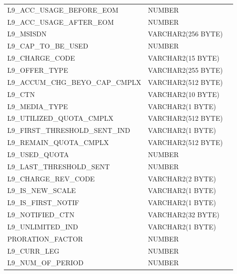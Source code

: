 \documentclass[12pt,twoside]{article}
\begin{document}
\begin{longtable}{lll}
 L9\_ACC\_USAGE\_BEFORE\_EOM          &  NUMBER               &               \\
 L9\_ACC\_USAGE\_AFTER\_EOM           &  NUMBER               &               \\
 L9\_MSISDN                           &  VARCHAR2(256 BYTE)   &               \\
 L9\_CAP\_TO\_BE\_USED                &  NUMBER               &               \\
 L9\_CHARGE\_CODE                     &  VARCHAR2(15 BYTE)    &               \\
 L9\_OFFER\_TYPE                      &  VARCHAR2(255 BYTE)   &               \\
 L9\_ACCUM\_CHG\_BEYO\_CAP\_CMPLX     &  VARCHAR2(512 BYTE)   &               \\
 L9\_CTN                              &  VARCHAR2(10 BYTE)    &               \\
 L9\_MEDIA\_TYPE                      &  VARCHAR2(1 BYTE)     &               \\
 L9\_UTILIZED\_QUOTA\_CMPLX           &  VARCHAR2(512 BYTE)   &               \\
 L9\_FIRST\_THRESHOLD\_SENT\_IND      &  VARCHAR2(1 BYTE)     &               \\
 L9\_REMAIN\_QUOTA\_CMPLX             &  VARCHAR2(512 BYTE)   &               \\
 L9\_USED\_QUOTA                      &  NUMBER               &               \\
 L9\_LAST\_THRESHOLD\_SENT            &  NUMBER               &               \\
 L9\_CHARGE\_REV\_CODE                &  VARCHAR2(2 BYTE)     &               \\
 L9\_IS\_NEW\_SCALE                   &  VARCHAR2(1 BYTE)     &               \\
 L9\_IS\_FIRST\_NOTIF                 &  VARCHAR2(1 BYTE)     &               \\
 L9\_NOTIFIED\_CTN                    &  VARCHAR2(32 BYTE)    &               \\
 L9\_UNLIMITED\_IND                   &  VARCHAR2(1 BYTE)     &               \\
 PRORATION\_FACTOR                    &  NUMBER               &               \\
 L9\_CURR\_LEG                        &  NUMBER               &               \\
 L9\_NUM\_OF\_PERIOD                  &  NUMBER               &               \\

\end{longtable}
\end{document}
